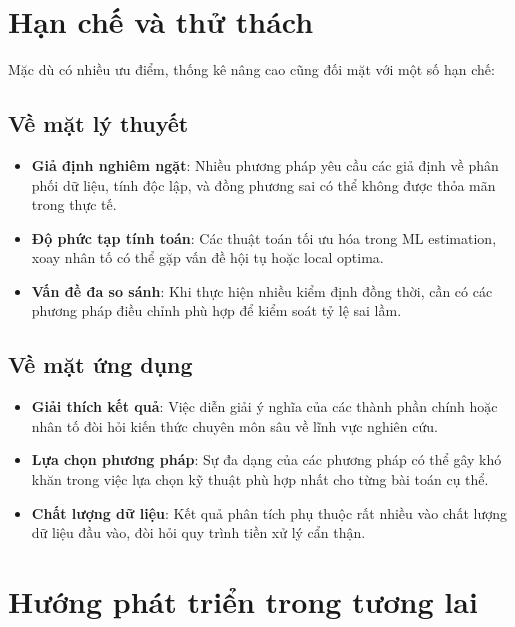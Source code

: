 \section*{Hạn chế và thử thách}

Mặc dù có nhiều ưu điểm, thống kê nâng cao cũng đối mặt với một số hạn chế:

\subsection*{Về mặt lý thuyết}

\begin{itemize}
    \item \textbf{Giả định nghiêm ngặt}: Nhiều phương pháp yêu cầu các giả định về phân phối dữ liệu, tính độc lập, và đồng phương sai có thể không được thỏa mãn trong thực tế.
    
    \item \textbf{Độ phức tạp tính toán}: Các thuật toán tối ưu hóa trong ML estimation, xoay nhân tố có thể gặp vấn đề hội tụ hoặc local optima.
    
    \item \textbf{Vấn đề đa so sánh}: Khi thực hiện nhiều kiểm định đồng thời, cần có các phương pháp điều chỉnh phù hợp để kiểm soát tỷ lệ sai lầm.
\end{itemize}

\subsection*{Về mặt ứng dụng}

\begin{itemize}
    \item \textbf{Giải thích kết quả}: Việc diễn giải ý nghĩa của các thành phần chính hoặc nhân tố đòi hỏi kiến thức chuyên môn sâu về lĩnh vực nghiên cứu.
    
    \item \textbf{Lựa chọn phương pháp}: Sự đa dạng của các phương pháp có thể gây khó khăn trong việc lựa chọn kỹ thuật phù hợp nhất cho từng bài toán cụ thể.
    
    \item \textbf{Chất lượng dữ liệu}: Kết quả phân tích phụ thuộc rất nhiều vào chất lượng dữ liệu đầu vào, đòi hỏi quy trình tiền xử lý cẩn thận.
\end{itemize}

\section*{Hướng phát triển trong tương lai}

